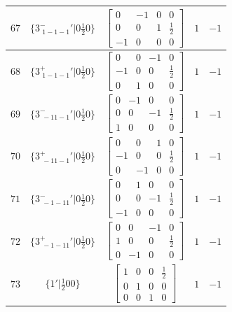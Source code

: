 \documentclass[fleqn,8pt]{jsarticle}
\begin{document}
\begin{longtable}{ccccc}
$ 67 $ & $ \{3^{-}_{\,\,1-1-1}{}'|0 \frac{1}{2} 0\} $ & $ \begin{bmatrix} 0 & -1 & 0 & 0 \\ 0 & 0 & 1 & \frac{1}{2} \\ -1 & 0 & 0 & 0 \end{bmatrix} $ & $ 1 $ & $ -1 $ \\ \hline
$ 68 $ & $ \{3^{+}_{\,\,1-1-1}{}'|0 \frac{1}{2} 0\} $ & $ \begin{bmatrix} 0 & 0 & -1 & 0 \\ -1 & 0 & 0 & \frac{1}{2} \\ 0 & 1 & 0 & 0 \end{bmatrix} $ & $ 1 $ & $ -1 $ \\ \hline
$ 69 $ & $ \{3^{-}_{\,\,-11-1}{}'|0 \frac{1}{2} 0\} $ & $ \begin{bmatrix} 0 & -1 & 0 & 0 \\ 0 & 0 & -1 & \frac{1}{2} \\ 1 & 0 & 0 & 0 \end{bmatrix} $ & $ 1 $ & $ -1 $ \\ \hline
$ 70 $ & $ \{3^{+}_{\,\,-11-1}{}'|0 \frac{1}{2} 0\} $ & $ \begin{bmatrix} 0 & 0 & 1 & 0 \\ -1 & 0 & 0 & \frac{1}{2} \\ 0 & -1 & 0 & 0 \end{bmatrix} $ & $ 1 $ & $ -1 $ \\ \hline
$ 71 $ & $ \{3^{-}_{\,\,-1-11}{}'|0 \frac{1}{2} 0\} $ & $ \begin{bmatrix} 0 & 1 & 0 & 0 \\ 0 & 0 & -1 & \frac{1}{2} \\ -1 & 0 & 0 & 0 \end{bmatrix} $ & $ 1 $ & $ -1 $ \\ \hline
$ 72 $ & $ \{3^{+}_{\,\,-1-11}{}'|0 \frac{1}{2} 0\} $ & $ \begin{bmatrix} 0 & 0 & -1 & 0 \\ 1 & 0 & 0 & \frac{1}{2} \\ 0 & -1 & 0 & 0 \end{bmatrix} $ & $ 1 $ & $ -1 $ \\ \hline
$ 73 $ & $ \{1{}'|\frac{1}{2} 0 0\} $ & $ \begin{bmatrix} 1 & 0 & 0 & \frac{1}{2} \\ 0 & 1 & 0 & 0 \\ 0 & 0 & 1 & 0 \end{bmatrix} $ & $ 1 $ & $ -1 $ \\ \hline

\end{longtable}
\end{document}
